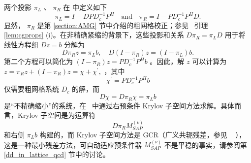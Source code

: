 \documentclass{siamltex}
\newcommand{\MSAP}[1]{M_\mathit{SAP}^{(#1)}}
\begin{document}
两个投影    $\pi_{L}$    、    $\pi_{R}$    在    \cite{Luescher2007}    中定义如下
\begin{equation}\label{eq:pilr}
  \pi_{L} = I - DPD_{c}^{-1}P^{H}\quad \text{and}\quad \pi_{R} = I - PD_{c}^{-1}P^{H}D.
\end{equation}    显然，   $\pi_{R}$    是第    \ref{section:AMG}    节中介绍的粗网格校正；参见 \  引理~    \ref{lem:cgprops}    (i)。在非精确紧缩的背景下，这些投影和关系    $D\pi_{R} = \pi_{L}D$    用于将线性方程组    $Dz = b$    分解为
\begin{equation*}
  D\pi_{R} z = \pi_{L} b, \quad D(I - \pi_{R}) z = (I - \pi_{L}) b .
\end{equation*}    第二个方程可以简化为    $(I-\pi_{R})z = PD_{c}^{-1}P^{H}b$    。因此，解    $z$    可以计算为    $z = \pi_Rz + (I-\pi_R)z = \chi + \chi^{\prime},$   ，其中
\begin{equation*}
  \chi^{\prime} = PD_{c}^{-1}P^{H}b
\end{equation*}    仅需要粗网格系统    $D_{c}$    的解，而
\begin{equation*}
  D \chi = D \pi_R \chi = \pi_{L} b
\end{equation*}    是“不精确缩小”的系统，在~    \cite{Luescher2007}    中通过右预条件 Krylov 子空间方法求解。具体而言，Krylov 子空间是为运算符
\begin{equation*}
  D \pi_{R} \MSAP{\nu}
\end{equation*}    和右侧    $\pi_{L}b$    构建的，而 Krylov 子空间方法是 GCR（广义共轭残差，参见 \     \cite{Saad:2003:IMS:829576}    ），这是一种最小残差方法，可自动适应预条件器    $\MSAP{\nu}$    不是平稳的事实，请参阅第~    \ref{dd_in_lattice_qcd}    节中的讨论。
\end{document}
